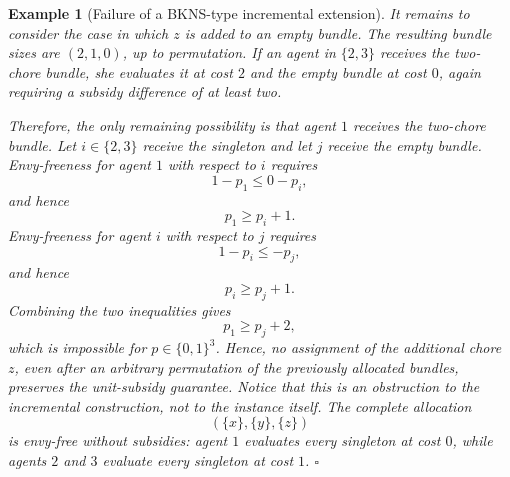 \documentclass[sigconf,anonymous]{aamas}
\theoremstyle{acmplain}
\theoremstyle{acmdefinition}
\newtheorem{example}[theorem]{Example}
\theoremstyle{acmplain}
\begin{document}
\begin{example}[Failure of a BKNS-type incremental extension]
It remains to consider the case in which $z$ is added to an empty bundle. The resulting bundle sizes are $(2,1,0)$, up to permutation. If an agent in $\{2,3\}$ receives the two-chore bundle, she evaluates it at cost $2$ and the empty bundle at cost $0$, again requiring a subsidy difference of at least two.

Therefore, the only remaining possibility is that agent $1$ receives the two-chore bundle. Let $i\in\{2,3\}$ receive the singleton and let $j$ receive the empty bundle. Envy-freeness for agent $1$ with respect to $i$ requires
\[
1-p_1\le 0-p_i,
\]
and hence
\[
p_1\ge p_i+1.
\]
Envy-freeness for agent $i$ with respect to $j$ requires \[
1-p_i\le -p_j,
\] and hence
\[
p_i\ge p_j+1.
\] Combining the two inequalities gives
\[
p_1\ge p_j+2,
\] which is impossible for $p\in\{0,1\}^3$. Hence, no assignment of the additional chore $z$, even after an arbitrary permutation of the previously allocated bundles, preserves the unit-subsidy guarantee. Notice that this is an obstruction to the incremental construction, not to the instance itself. The complete allocation
\[
(\{x\},\{y\},\{z\})
\] is envy-free without subsidies: agent $1$ evaluates every singleton at cost $0$, while agents $2$ and $3$ evaluate every singleton at cost $1$. \hfill $\square$
\end{example}





\end{document}
